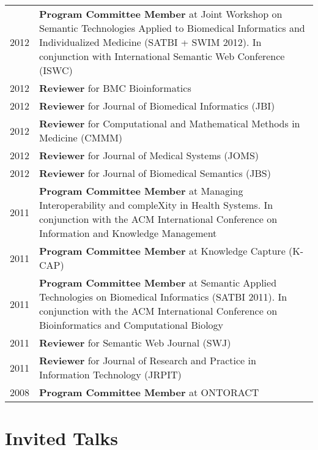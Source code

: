 \documentclass[11pt,fullpage]{article}
\begin{document}
\begin{longtable}{p{0.5in}|p{5.5in}}
2012 & \textbf{Program Committee Member} at Joint Workshop on Semantic Technologies Applied to Biomedical Informatics and Individualized Medicine (SATBI + SWIM 2012). In conjunction with International Semantic Web Conference (ISWC)\\
2012  & \textbf{Reviewer} for BMC Bioinformatics \\
2012  & \textbf{Reviewer} for Journal of Biomedical Informatics (JBI) \\
2012  & \textbf{Reviewer} for Computational and Mathematical Methods in Medicine (CMMM) \\
2012  & \textbf{Reviewer} for Journal of Medical Systems (JOMS) \\
2012  & \textbf{Reviewer} for Journal of Biomedical Semantics (JBS) \\
2011 & \textbf{Program Committee Member} at Managing Interoperability and compleXity in Health Systems. In conjunction with the ACM International Conference on Information and Knowledge Management\\
2011 & \textbf{Program Committee Member} at Knowledge Capture (K-CAP)\\
2011 & \textbf{Program Committee Member} at Semantic Applied Technologies on Biomedical Informatics (SATBI 2011). In conjunction with the ACM International Conference on Bioinformatics and Computational Biology\\
2011  & \textbf{Reviewer} for Semantic Web Journal (SWJ) \\
2011  & \textbf{Reviewer} for Journal of Research and Practice in Information Technology (JRPIT)\\
2008 & \textbf{Program Committee Member} at ONTORACT \\

\end{longtable}


\section*{Invited Talks}
\end{document}
